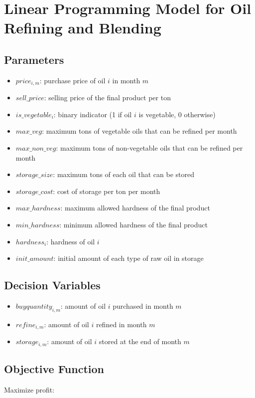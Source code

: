 \documentclass{article}
\begin{document}
\section*{Linear Programming Model for Oil Refining and Blending}

\subsection*{Parameters}
\begin{itemize}
    \item $price_{i,m}$: purchase price of oil $i$ in month $m$
    \item $sell\_price$: selling price of the final product per ton
    \item $is\_vegetable_{i}$: binary indicator (1 if oil $i$ is vegetable, 0 otherwise)
    \item $max\_veg$: maximum tons of vegetable oils that can be refined per month
    \item $max\_non\_veg$: maximum tons of non-vegetable oils that can be refined per month
    \item $storage\_size$: maximum tons of each oil that can be stored
    \item $storage\_cost$: cost of storage per ton per month
    \item $max\_hardness$: maximum allowed hardness of the final product
    \item $min\_hardness$: minimum allowed hardness of the final product
    \item $hardness_{i}$: hardness of oil $i$
    \item $init\_amount$: initial amount of each type of raw oil in storage
\end{itemize}

\subsection*{Decision Variables}
\begin{itemize}
    \item $buyquantity_{i,m}$: amount of oil $i$ purchased in month $m$
    \item $refine_{i,m}$: amount of oil $i$ refined in month $m$
    \item $storage_{i,m}$: amount of oil $i$ stored at the end of month $m$
\end{itemize}

\subsection*{Objective Function}
Maximize profit:
\end{document}
